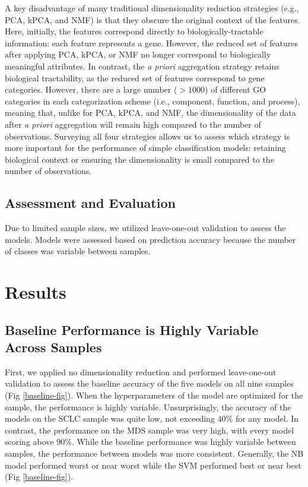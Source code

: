 \documentclass{article}
\begin{document}
A key disadvantage of many traditional dimensionality reduction strategies (e.g., PCA, kPCA, and NMF) is that they obscure the original context of the features. Here, initially, the features correspond directly to biologically-tractable information: each feature represents a gene. However, the reduced set of features after applying PCA, kPCA, or NMF no longer correspond to biologically meaningful attributes. In contrast, the {\itshape a priori} aggregation strategy retains biological tractability, as the reduced set of features correspond to gene categories. However, there are a large number ($>1000$) of different GO categories in each categorization scheme (i.e., component, function, and process), meaning that, unlike for PCA, kPCA, and NMF, the dimensionality of the data after {\itshape a priori} aggregation will remain high compared to the number of observations. Surveying all four strategies allows us to assess which strategy is more important for the performance of simple classification models: retaining biological context or ensuring the dimensionality is small compared to the number of observations.

\subsection{Assessment and Evaluation}

Due to limited sample sizes, we utilized leave-one-out validation to assess the models. Models were assessed based on prediction accuracy because the number of classes was variable between samples.

\section{Results}

\subsection{Baseline Performance is Highly Variable Across Samples}

First, we applied no dimensionality reduction and performed leave-one-out validation to assess the baseline accuracy of the five models on all nine samples (Fig \ref{baseline-fig}). When the hyperparameters of the model are optimized for the sample, the performance is highly variable. Unsurprisingly, the accuracy of the models on the SCLC sample was quite low, not exceeding $40\%$ for any model. In contrast, the performance on the MDS sample was very high, with every model scoring above $90\%$. While the baseline performance was highly variable between samples, the performance between models was more consistent. Generally, the NB model performed worst or near worst while the SVM performed best or near best (Fig \ref{baseline-fig}).
\end{document}
